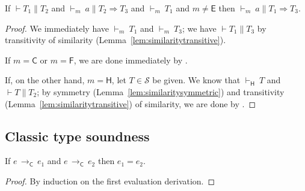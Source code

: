 \documentclass[9pt]{extarticle}
\newcommand{\ottnt}[1]{\mathit{#1}}
\newcommand{\ottsym}[1]{#1}
\begin{document}
\begin{lemma}
  \label{lem:typesettransitive}
  If $\vdash  \ottnt{T_{{\mathrm{1}}}}  \mathrel{\parallel}  \ottnt{T_{{\mathrm{2}}}}$ and $ \mathord{  \vdash _{ \ottnt{m} } }~ \ottnt{a}   \mathrel{\parallel}   \ottnt{T_{{\mathrm{2}}}}  \Rightarrow  \ottnt{T_{{\mathrm{3}}}} $ and $ \mathord{  \vdash _{ \ottnt{m} } }~ \ottnt{T_{{\mathrm{1}}}} $
  and $\ottnt{m}  \neq   \mathsf{E} $ then $ \mathord{  \vdash _{ \ottnt{m} } }~ \ottnt{a}   \mathrel{\parallel}   \ottnt{T_{{\mathrm{1}}}}  \Rightarrow  \ottnt{T_{{\mathrm{3}}}} $.
\begin{proof}
    We immediately have $ \mathord{  \vdash _{ \ottnt{m} } }~ \ottnt{T_{{\mathrm{1}}}} $ and $ \mathord{  \vdash _{ \ottnt{m} } }~ \ottnt{T_{{\mathrm{3}}}} $; we have $\vdash  \ottnt{T_{{\mathrm{1}}}}  \mathrel{\parallel}  \ottnt{T_{{\mathrm{3}}}}$ by transitivity of similarity
    (Lemma~\ref{lem:similaritytransitive}).

    If $\ottnt{m}  \ottsym{=}   \mathsf{C} $ or $\ottnt{m}  \ottsym{=}   \mathsf{F} $, we are done immediately by
    .

    If, on the other hand, $\ottnt{m}  \ottsym{=}   \mathsf{H} $, let $ \ottnt{T}  \in  \mathcal{S} $ be given. We
    know that $ \mathord{  \vdash _{  \mathsf{H}  } }~ \ottnt{T} $ and $\vdash  \ottnt{T}  \mathrel{\parallel}  \ottnt{T_{{\mathrm{2}}}}$; by symmetry
    (Lemma~\ref{lem:similaritysymmetric}) and transitivity
    (Lemma~\ref{lem:similaritytransitive}) of similarity, we are done
    by .
  \end{proof}
\end{lemma}

\subsection{Classic type soundness}
\label{app:classicsoundness}

\begin{lemma}
  \label{lem:classicdeterminism}
  If $\ottnt{e} \,  \longrightarrow _{  \mathsf{C}  }  \, \ottnt{e_{{\mathrm{1}}}}$ and $\ottnt{e} \,  \longrightarrow _{  \mathsf{C}  }  \, \ottnt{e_{{\mathrm{2}}}}$ then $\ottnt{e_{{\mathrm{1}}}}  \ottsym{=}  \ottnt{e_{{\mathrm{2}}}}$.
\begin{proof}
    By induction on the first evaluation derivation.
  \end{proof}  
\end{lemma}
\end{document}
